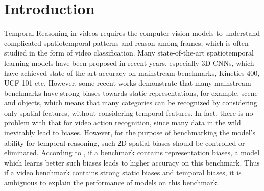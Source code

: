 \documentclass[nohyperref]{article}
\theoremstyle{plain}
\theoremstyle{definition}
\theoremstyle{remark}
\begin{document}
\section{Introduction}
Temporal Reasoning in videos requires the computer vision models to understand complicated spatiotemporal patterns and reason among frames, which is often studied in the form of video classification. Many state-of-the-art spatiotemporal learning models have been proposed in recent years, especially 3D CNNs\cite{DBLP:conf/cvpr/CarreiraZ17,DBLP:conf/cvpr/WangL0G18,DBLP:conf/cvpr/0004GGH18,DBLP:journals/corr/abs-1812-03982}, which have achieved state-of-the-art accuracy on mainstream benchmarks, Kinetics-400, UCF-101 etc\cite{DBLP:conf/cvpr/CarreiraZ17,DBLP:journals/corr/abs-1212-0402}. However, some recent works\cite{Girdhar2020CATER:,Li_2018_ECCV} demonstrate that many mainstream benchmarks have strong biases towards static representations, for example, scene and objects, which means that many categories can be recognized by considering only spatial features, without considering temporal features.  In fact, there is no problem with that for video action recognition, since many data in the wild inevitably lead to biases. However, for the purpose of benchmarking the model's ability for temporal reasoning, such 2D spatial biases should be controlled or eliminated. According to \cite{Li_2018_ECCV}, if a benchmark contains representation biases, a model which learns better such biases leads to higher accuracy on this benchmark. Thus if a video benchmark contains strong static biases and temporal biases, it is ambiguous to explain the performance of models on this benchmark.
\end{document}
